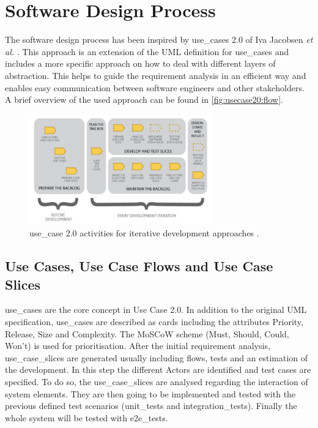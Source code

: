 \section{Software Design Process}
\label{sec:design}

The software design process has been inspired by \Glspl{use_case} 2.0 of Iva Jacobsen \textit{et al.} \cite{jacobson2011usecase}. This approach is an extension of the \gls{UML} definition for \glspl{use_case} and includes a more specific approach on how to deal with different layers of abstraction. This helps to guide the requirement analysis in an efficient way and enables easy communication between software engineers and other stakeholders. A brief overview of the used approach can be found in \autoref{fig:usecase20:flow}.

\begin{figure}[!ht]
\centering
\includegraphics[width=0.7\textwidth]{figures/uc20_flow}
\caption{\Gls{use_case} 2.0 activities for iterative development approaches \cite{jacobson2011usecase}.}
\label{fig:usecase20:flow}
\end{figure}


\subsection{Use Cases, Use Case Flows and Use Case Slices}
\Glspl{use_case} are the core concept in Use Case 2.0. In addition to the original \gls{UML} specification, \glspl{use_case} are described as cards including the attributes Priority, Release, Size and Complexity. The MoSCoW scheme \cite{moscow} (Must, Should, Could, Won't) is used for prioritisation. After the initial requirement analysis, \glspl{use_case_slice} are generated usually including flows, tests and an estimation of the development. In this step the different \glspl{Actor} are identified and test cases are specified. To do so, the \glspl{use_case_slice} are analysed regarding the interaction of system elements. They are then going to be implemented and tested with the previous defined test scenarios (\glspl{unit_test} and \glspl{integration_test}). Finally the whole system will be tested with \glspl{e2e_test}.

